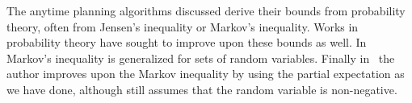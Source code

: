 The anytime planning algorithms discussed derive their bounds from probability theory, often from Jensen's inequality or Markov's inequality. Works in probability theory have sought to improve upon these bounds as well. In~\cite{Ramdas23arxiv} Markov's inequality is generalized for sets of random variables. Finally in~\cite{Castillo23arxiv} the author improves upon the Markov inequality by using the partial expectation as we have done, although still assumes that the random variable is non-negative.